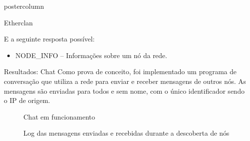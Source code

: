 \documentclass[final]{beamer}
\begin{document}
\begin{frame}
\begin{columns}
\begin{column}{.5\textwidth}
\begin{beamercolorbox}[center,wd=\textwidth]{postercolumn}
\begin{minipage}[T]{.95\textwidth}
{\begin{block}{Etherclan}
                \vspace*{0.2cm}
                
                E a seguinte resposta possível:
                \begin{itemize}
                  \item NODE\_INFO -- Informações sobre um nó da rede.
                \end{itemize}
                
                \vspace*{0.2cm} 
            \end{block}

            \vspace*{0.2cm} 
            
            \begin{block}{Resultados: Chat}
              \justifying 
                Como prova de conceito, foi implementado um programa de conversação que utiliza a rede para enviar e receber
                mensagens de outros nós. As mensagens são enviadas para todos e sem nome, com o único identificador sendo o IP
                de origem.
                
                \begin{figure}[htp]
                  \centering
                  \caption{Chat em funcionamento}
                \end{figure}
                \begin{figure}[htp]
                  \centering
                  \caption{Log das mensagens enviadas e recebidas durante a descoberta de nós}
                \end{figure}
                

\end{block}}
\end{minipage}
\end{beamercolorbox}
\end{column}
\end{columns}
\end{frame}
\end{document}
